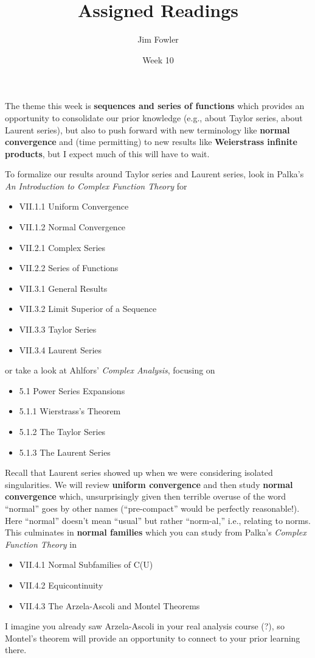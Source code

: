 \documentclass{homework}
\author{Jim Fowler}
\title{Assigned Readings}
\date{Week 10}
\begin{document}
\maketitle

The theme this week is \textbf{sequences and series of functions}
which provides an opportunity to consolidate our prior knowledge
(e.g., about Taylor series, about Laurent series), but also to push
forward with new terminology like \textbf{normal convergence} and
(time permitting) to new results like \textbf{Weierstrass infinite
  products}, but I expect much of this will have to wait.

To formalize our results around Taylor series and Laurent series, look
in Palka's \textit{An Introduction to Complex Function Theory} for
\begin{itemize}
\item VII.1.1 Uniform Convergence
\item VII.1.2 Normal Convergence
\item VII.2.1 Complex Series
\item VII.2.2 Series of Functions
\item VII.3.1 General Results
\item VII.3.2 Limit Superior of a Sequence
\item VII.3.3 Taylor Series
\item VII.3.4 Laurent Series
\end{itemize}
or take a look at Ahlfors' \textit{Complex Analysis}, focusing on
\begin{itemize}
\item 5.1 Power Series Expansions
\item 5.1.1 Wierstrass's Theorem
\item 5.1.2 The Taylor Series
\item 5.1.3 The Laurent Series
\end{itemize}
Recall that Laurent series showed up when we were considering isolated
singularities.  We will review \textbf{uniform convergence} and then
study \textbf{normal convergence} which, unsurprisingly given then
terrible overuse of the word ``normal'' goes by other names
(``pre-compact'' would be perfectly reasonable!).  Here
``normal'' doesn't mean ``usual'' but rather ``norm-al,'' i.e.,
relating to norms.  This culminates in \textbf{normal families} which
you can study from Palka's \textit{Complex Function Theory} in
\begin{itemize}  
\item VII.4.1 Normal Subfamilies of C(U)
\item VII.4.2 Equicontinuity
\item VII.4.3 The Arzela-Ascoli and Montel Theorems
\end{itemize}
I imagine you already saw Arzela-Ascoli in your real analysis course
(?), so Montel's theorem will provide an opportunity to connect to
your prior learning there.
\end{document}
